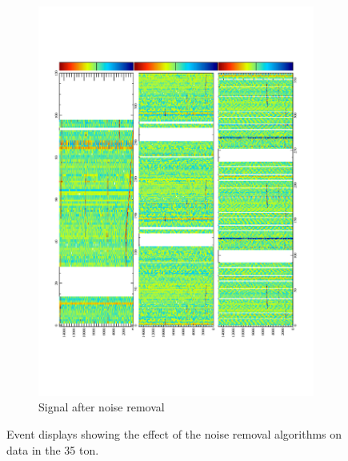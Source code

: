\begin{figure}[h!]
\begin{subfigure}{0.45\textwidth}
    \includegraphics[width=\textwidth]{Evd_AfterNoise}
    \caption{Signal after noise removal}
  \end{subfigure}
  \caption[The effect of noise removal algorithms in the 35 ton]{Event displays showing the effect of the noise removal algorithms on data in the 35 ton.}
  \label{fig:NoiseRemoval}
\end{figure}

